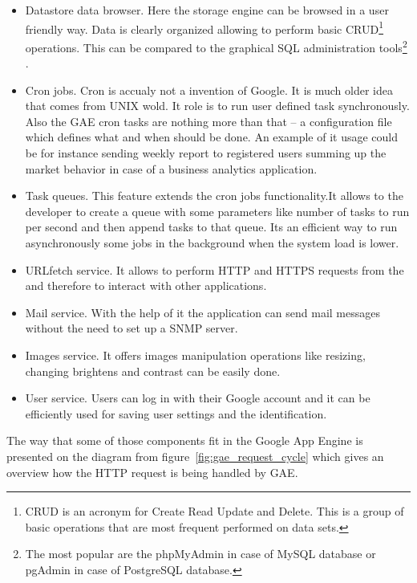 \begin{itemize}
\item{Datastore data browser. Here the storage engine can be browsed in a user friendly way. Data is clearly organized allowing to perform basic CRUD\footnote{CRUD is an acronym for Create Read Update and Delete. This is a group of basic operations that are most frequent performed on data sets.} operations. This can be compared to the graphical SQL administration tools\footnote{The most popular are the phpMyAdmin in case of MySQL database or pgAdmin in case of PostgreSQL database.} .}
\item{Cron jobs.} Cron is accualy not a invention of Google. It is much older idea that comes from UNIX wold. It role is to run user defined task synchronously. Also the GAE cron tasks are nothing more than that -- a configuration file which defines what and when should be done. An example of it usage could be for instance sending weekly report to registered users summing up the market behavior in case of a business analytics application.     
\item{Task queues.} This feature extends the cron jobs functionality.It allows to the developer to create a queue with some parameters like number of tasks to run per second and then append tasks to that queue. Its an efficient way to run asynchronously some jobs in the background when the system load is lower.  
\item{URLfetch service. It allows to perform HTTP and HTTPS requests from the and therefore to interact with other applications.}
\item{Mail service. With the help of it the application can send mail messages without the need to set up a SNMP server.}
\item{Images service. It offers images manipulation operations like resizing, changing brightens and contrast can be easily done.	}
\item{User service. Users can log in with their Google account and it can be efficiently used  for saving user settings and the identification.} 
\end{itemize}
The way that some of those components fit in the Google App Engine is presented on the diagram from figure~\ref{fig:gae_request_cycle} which gives an overview how the HTTP request is being handled by GAE.\newpage 
